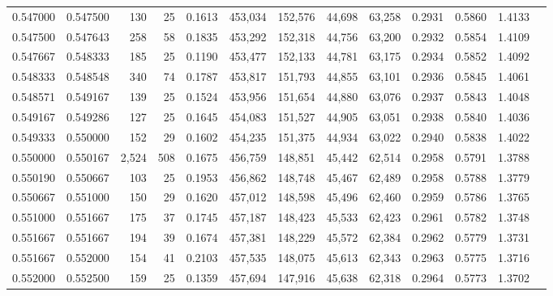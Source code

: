 \begin{tabular}{rrrrrrrrrrrrr}
0.547000 & 0.547500 &   130 &  25 &                                     0.1613 & 453,034 & 152,576 &  44,698 &  63,258 & 0.2931 & 0.5860 & 1.4133 \\
0.547500 & 0.547643 &   258 &  58 &                                     0.1835 & 453,292 & 152,318 &  44,756 &  63,200 & 0.2932 & 0.5854 & 1.4109 \\
0.547667 & 0.548333 &   185 &  25 &                                     0.1190 & 453,477 & 152,133 &  44,781 &  63,175 & 0.2934 & 0.5852 & 1.4092 \\
0.548333 & 0.548548 &   340 &  74 &                                     0.1787 & 453,817 & 151,793 &  44,855 &  63,101 & 0.2936 & 0.5845 & 1.4061 \\
0.548571 & 0.549167 &   139 &  25 &                                     0.1524 & 453,956 & 151,654 &  44,880 &  63,076 & 0.2937 & 0.5843 & 1.4048 \\
0.549167 & 0.549286 &   127 &  25 &                                     0.1645 & 454,083 & 151,527 &  44,905 &  63,051 & 0.2938 & 0.5840 & 1.4036 \\
0.549333 & 0.550000 &   152 &  29 &                                     0.1602 & 454,235 & 151,375 &  44,934 &  63,022 & 0.2940 & 0.5838 & 1.4022 \\
0.550000 & 0.550167 & 2,524 & 508 &                                     0.1675 & 456,759 & 148,851 &  45,442 &  62,514 & 0.2958 & 0.5791 & 1.3788 \\
0.550190 & 0.550667 &   103 &  25 &                                     0.1953 & 456,862 & 148,748 &  45,467 &  62,489 & 0.2958 & 0.5788 & 1.3779 \\
0.550667 & 0.551000 &   150 &  29 &                                     0.1620 & 457,012 & 148,598 &  45,496 &  62,460 & 0.2959 & 0.5786 & 1.3765 \\
0.551000 & 0.551667 &   175 &  37 &                                     0.1745 & 457,187 & 148,423 &  45,533 &  62,423 & 0.2961 & 0.5782 & 1.3748 \\
0.551667 & 0.551667 &   194 &  39 &                                     0.1674 & 457,381 & 148,229 &  45,572 &  62,384 & 0.2962 & 0.5779 & 1.3731 \\
0.551667 & 0.552000 &   154 &  41 &                                     0.2103 & 457,535 & 148,075 &  45,613 &  62,343 & 0.2963 & 0.5775 & 1.3716 \\
0.552000 & 0.552500 &   159 &  25 &                                     0.1359 & 457,694 & 147,916 &  45,638 &  62,318 & 0.2964 & 0.5773 & 1.3702 \\

\end{tabular}
